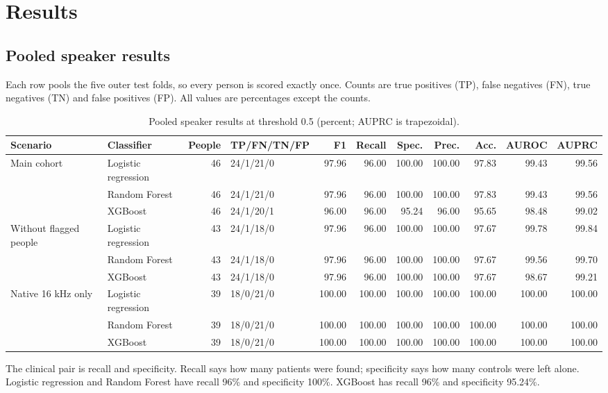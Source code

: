 \documentclass[11pt,a4paper]{article}
\begin{document}
\section{Results}\label{sec:results}
\subsection{Pooled speaker results}\label{sec:pooled}
Each row pools the five outer test folds, so every person is scored exactly once. Counts are true positives (TP), false negatives (FN), true negatives (TN) and false positives (FP). All values are percentages except the counts.

\begin{table}[H]\centering\scriptsize\renewcommand{\arraystretch}{1.15}
\caption{Pooled speaker results at threshold 0.5 (percent; AUPRC is trapezoidal).}
\begin{tabular}{llrlrrrrrrr}
\toprule
\textbf{Scenario} & \textbf{Classifier} & \textbf{People} & \textbf{TP/FN/TN/FP} & \textbf{F1} & \textbf{Recall} & \textbf{Spec.} & \textbf{Prec.} & \textbf{Acc.} & \textbf{AUROC} & \textbf{AUPRC}\\
\midrule
Main cohort & Logistic regression & 46 & 24/1/21/0 & 97.96 & 96.00 & 100.00 & 100.00 & 97.83 & 99.43 & 99.56\\
 & Random Forest & 46 & 24/1/21/0 & 97.96 & 96.00 & 100.00 & 100.00 & 97.83 & 99.43 & 99.56\\
 & XGBoost & 46 & 24/1/20/1 & 96.00 & 96.00 & 95.24 & 96.00 & 95.65 & 98.48 & 99.02\\
\midrule
Without flagged people & Logistic regression & 43 & 24/1/18/0 & 97.96 & 96.00 & 100.00 & 100.00 & 97.67 & 99.78 & 99.84\\
 & Random Forest & 43 & 24/1/18/0 & 97.96 & 96.00 & 100.00 & 100.00 & 97.67 & 99.56 & 99.70\\
 & XGBoost & 43 & 24/1/18/0 & 97.96 & 96.00 & 100.00 & 100.00 & 97.67 & 98.67 & 99.21\\
\midrule
Native 16 kHz only & Logistic regression & 39 & 18/0/21/0 & 100.00 & 100.00 & 100.00 & 100.00 & 100.00 & 100.00 & 100.00\\
 & Random Forest & 39 & 18/0/21/0 & 100.00 & 100.00 & 100.00 & 100.00 & 100.00 & 100.00 & 100.00\\
 & XGBoost & 39 & 18/0/21/0 & 100.00 & 100.00 & 100.00 & 100.00 & 100.00 & 100.00 & 100.00\\
\bottomrule
\end{tabular}\end{table}
\begin{tcolorbox}[colback=orange!5,colframe=orange!70!black,boxrule=0.5pt,arc=2pt,left=5pt,right=5pt,top=3pt,bottom=3pt,title={\small\bfseries Key point}]\small The clinical pair is recall and specificity. Recall says how many patients were found; specificity says how many controls were left alone. Logistic regression and Random Forest have recall 96\% and specificity 100\%. XGBoost has recall 96\% and specificity 95.24\%.\end{tcolorbox}
\end{document}
